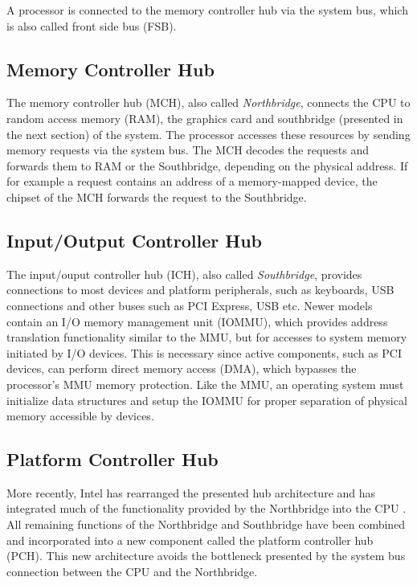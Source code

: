 A processor is connected to the memory controller hub via the system bus, which
is also called front side bus (FSB).

\subsection{Memory Controller Hub}
The memory controller hub (MCH), also called \emph{Northbridge},
connects the CPU to random access memory (RAM), the graphics card and
southbridge (presented in the next section) of the system. The processor
accesses these resources by sending memory requests via the system bus. The MCH
decodes the requests and forwards them to RAM or the Southbridge, depending on
the physical address. If for example a request contains an address of a
memory-mapped device, the chipset of the MCH forwards the request to the
Southbridge.

\subsection{Input/Output Controller Hub}
The input/ouput controller hub (ICH), also called \emph{Southbridge}, provides
connections to most devices and platform peripherals, such as keyboards, USB
connections and other buses such as PCI Express, USB etc. Newer models contain
an I/O memory management unit (IOMMU), which provides address translation
functionality similar to the MMU, but for accesses to system memory initiated by
I/O devices. This is necessary since active components, such as PCI devices, can
perform direct memory access (DMA), which bypasses the processor's
MMU memory protection. Like the MMU, an operating system must initialize data
structures and setup the IOMMU for proper separation of physical memory
accessible by devices.

\subsection{Platform Controller Hub}
More recently, Intel has rearranged the presented hub architecture and has
integrated much of the functionality provided by the Northbridge into the CPU
\cite{IntelQPI}. All remaining functions of the Northbridge and Southbridge have
been combined and incorporated into a new component called the platform
controller hub (PCH). This new architecture avoids the bottleneck
presented by the system bus connection between the CPU and the Northbridge.
